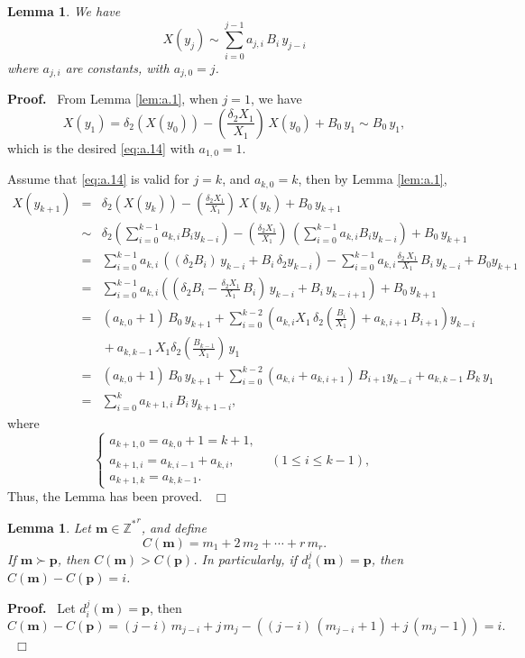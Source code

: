 \documentclass[preprint, 12pt]{elsarticle}
\newtheorem{lem}[thm]{Lemma}
\numberwithin{equation}{section}
\newenvironment{proof}[1][Proof]{\textbf{#1.}\ }{\ $\Box$}
\begin{document}
\begin{lem}
\label{lem:a.2} We have
\begin{equation} \label{eq:a.14} X(y_j) \sim
\sum_{i = 0}^{j-1}a_{j,i}\,B_i\,y_{j-i}
\end{equation}
 where $a_{j,i}$ are
constants, with $a_{j,0} = j$.
\end{lem}
\begin{proof} From Lemma \ref{lem:a.1}, when $j = 1$, we have
$$
X(y_1) = \delta_2(X(y_0)) - (\frac{\delta_2 X_1}{X_1})\,X(y_0) +
B_0\,y_1 \sim B_0\,y_1,
$$
which is the desired \eqref{eq:a.14} with $a_{1,0} = 1$. 

Assume that \eqref{eq:a.14} is valid for $j = k$, and $a_{k,0}=k$, then
by Lemma \ref{lem:a.1},
\begin{eqnarray*}
X(y_{k+1}) &=& \delta_2(X(y_k)) - (\frac{\delta_2
X_1}{X_1})\,X(y_k) + B_0\,y_{k+1}\\
&\sim&\delta_2(\sum_{i=0}^{k-1}a_{k,i}B_i y_{k-i}) -
(\frac{\delta_2 X_1}{X_1})\,(\sum_{i=0}^{k-1}a_{k,i}B_i y_{k-i})
+ B_0\,y_{k+1}\\
&=&\sum_{i=0}^{k-1}a_{k,i}\,((\delta_2B_i)\,y_{k-i} +
B_i\,\delta_2y_{k-i}) -
\sum_{i=0}^{k-1}a_{k,i}\frac{\delta_2\,X_1}{X_1}\,B_i\,y_{k-i} +
B_0y_{k+1}\\
&=&\sum_{i=0}^{k-1}a_{k,i}\left((\delta_2B_i - \frac{\delta_2
X_1}{X_1}\,B_i)\,y_{k-i} + B_i\,y_{k-i+1}\right) + B_0\,y_{k+1}\\
&=&(a_{k,0} + 1)\,B_0\,y_{k+1} + \sum_{i = 0}^{k-2}(a_{k,i}
X_1\,\delta_2(\frac{B_i}{X_1}) + a_{k,i+1}\,B_{i+1})y_{k-i}\\
&&{} + a_{k,k-1}\,X_1\delta_2(\frac{B_{k-1}}{X_1})\,y_1\\
&=&(a_{k,0} + 1)\,B_0\,y_{k+1} + \sum_{i = 0}^{k-2}(a_{k,i}
 + a_{k,i+1})\,B_{i+1}y_{k-i} + a_{k,k-1}\,B_{k}\,y_1\\
 &=&\sum_{i = 0}^ka_{k+1,i}\,B_i\,y_{k + 1 - i},
\end{eqnarray*}
where
$$\left\{\begin{array}{ll}
a_{k+1,0} = a_{k,0} + 1 = k+1,& \\
a_{k+1,i} = a_{k,i-1} + a_{k,i},&\ \ (1\leq i\leq k-1),\\
a_{k+1,k} = a_{k,k-1}.&
\end{array}\right.$$
Thus, the Lemma has been proved.
\end{proof}


\begin{lem}
\label{lem:a.12} Let $\mathbf{m}\in {\mathbb{Z}^*}^r$, and define
\begin{equation}
\label{eq:a.5} C({\mathbf{m}}) = m_1 + 2\,m_2 + \cdots + r\,m_r.
\end{equation}
 If
$\mathbf{m}\succ \mathbf{p}$, then $C({\mathbf{m}}) >
C({\mathbf{p}})$. In particularly, if $d_i^j(\mathbf{m}) =
\mathbf{p}$, then $C(\mathbf{m}) - C({\mathbf{p}}) = i$.
\end{lem}
\begin{proof} Let $d_i^j(\mathbf{m}) = \mathbf{p}$, then
$$C({\mathbf{m}}) - C({\mathbf{p}}) = (j-i)\,m_{j-i} + j\,m_j - ((j-i)\,(m_{j-i}+1) + j\,(m_j-1)) = i.$$
\end{proof}
\end{document}
